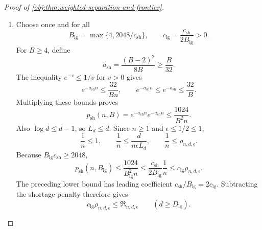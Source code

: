 \documentclass[11pt]{article}
\begin{document}
\begin{proof}[Proof of \cref{obj:thm:weighted-separation-and-frontier}]
\begin{enumerate}
\item
Choose once and for all
\[
B_{\mathrm{lg}}=\max\{4,2048/c_{\mathrm{sh}}\},
\qquad
c_{\mathrm{lg}}=\frac{c_{\mathrm{sh}}}{2B_{\mathrm{lg}}}>0.
\]
For \(B\ge4\), define
\[
a_{\mathrm{sh}}=\frac{(B-2)^2}{8B}\ge\frac B{32}.
\]
The inequality \(e^{-v}\le1/v\) for \(v>0\) gives
\[
e^{-a_{\mathrm{sh}}n}\le\frac{32}{Bn},
\qquad
e^{-a_{\mathrm{sh}}n}\le e^{-a_{\mathrm{sh}}}\le\frac{32}{B}.
\]
Multiplying these bounds proves
\[
p_{\mathrm{sh}}(n,B)
=e^{-a_{\mathrm{sh}}n}e^{-a_{\mathrm{sh}}n}
\le\frac{1024}{B^2n}.
\]
Also \(\log d\le d-1\), so \(L_d\le d\). Since \(n\ge1\) and
\(\epsilon\le1/2\le1\),
\[
\frac1n\le1,
\qquad
\frac1n\le\frac d{n\epsilon L_d},
\qquad
\frac1n\le\rho_{n,d,\epsilon}.
\]
Because \(B_{\mathrm{lg}}c_{\mathrm{sh}}\ge2048\),
\[
p_{\mathrm{sh}}(n,B_{\mathrm{lg}})
\le\frac{1024}{B_{\mathrm{lg}}^2n}
\le\frac{c_{\mathrm{sh}}}{2B_{\mathrm{lg}}}\frac1n
\le c_{\mathrm{lg}}\rho_{n,d,\epsilon}.
\]
The preceding lower bound has leading coefficient
\(c_{\mathrm{sh}}/B_{\mathrm{lg}}=2c_{\mathrm{lg}}\). Subtracting the shortage penalty therefore gives
\[
c_{\mathrm{lg}}\rho_{n,d,\epsilon}
\le\mathfrak R_{n,d,\epsilon}
\qquad(d\ge D_{\mathrm{lg}}).
\]


\end{enumerate}
\end{proof}
\end{document}
